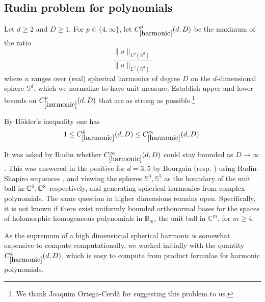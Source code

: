 \subsection{Rudin problem for polynomials}

\renewcommand{\problemURL}{https://google-deepmind.github.io/alphaevolve_repository_of_problems/problems/57.html}

\begin{problem}\label{harmonic}  Let $d \geq 2$ and $D \geq 1$.  For $p \in \{4,\infty\}$, let $C_{\ref{harmonic}}^p(d,D)$ be the maximum of the ratio
$$ \frac{\|u\|_{L^p({\mathbb S}^d)}}{\|u\|_{L^2({\mathbb S}^d)}}$$
where $u$ ranges over (real) spherical harmonics of degree $D$ on the $d$-dimensional sphere ${\mathbb S}^d$, which we normalize to have unit measure.  Establish upper and lower bounds on $C_{\ref{harmonic}}^p(d,D)$ that are as strong as possible.\footnote{We thank Joaquim Ortega-Cerd\`a for suggesting this problem to us.}
\end{problem}

By H\"older's inequality one has
$$1 \leq C_{\ref{harmonic}}^4(d,D) \leq C_{\ref{harmonic}}^\infty(d,D).$$

It was asked by Rudin whether $C_{\ref{harmonic}}^\infty(d,D)$ could stay bounded as $D \to \infty$.  This was answered in the positive for $d=3,5$ by Bourgain \cite{bourgain1985applications} (resp. \cite{bourgain2016uniformly})
using Rudin-Shapiro sequences \cite[p. 33]{katznelson1968}, and viewing the spheres ${\mathbb S}^3, {\mathbb S}^5$ as the boundary of the unit ball in $\mathbb{C}^2, \mathbb{C}^3$ respectively, and generating spherical harmonics from complex polynomials.  The same question in higher dimensions
remains open. Specifically, it is not known if there exist uniformly bounded orthonormal bases
for the spaces of holomorphic homogeneous polynomials in $\mathbb{B}_m$, the unit ball in $\mathbb{C}^m$, for $m \geq 4$.

As the supremum of a high dimensional spherical harmonic is somewhat expensive to compute computationally, we worked initially with the quantity $C_{\ref{harmonic}}^4(d,D)$, which is easy to compute from product formulae for harmonic polynomials.


